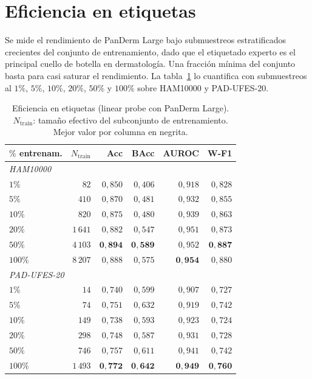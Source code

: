 \section{Eficiencia en etiquetas}
\label{sec:label-eff-results}

Se mide el rendimiento de PanDerm Large bajo submuestreos
estratificados crecientes del conjunto de entrenamiento, dado que el
etiquetado experto es el principal cuello de botella en dermatología.
Una fracción mínima del conjunto basta para casi saturar el
rendimiento. La tabla~\ref{tab:label-eff} lo cuantifica con
submuestreos al $1\%$,
$5\%$, $10\%$, $20\%$, $50\%$ y $100\%$ sobre HAM10000 y
PAD-UFES-20.

\begin{table}[htbp]
\centering
\footnotesize
\setlength{\tabcolsep}{4pt}
\renewcommand{\arraystretch}{0.95}
\caption{Eficiencia en etiquetas (linear probe con PanDerm Large).
$N_{\mathrm{train}}$: tamaño efectivo del subconjunto de
entrenamiento. Mejor valor por columna en negrita.}
\label{tab:label-eff}
\begin{tabular}{lrrrrr}
\hline
$\%$ entrenam.  & $N_{\mathrm{train}}$ & Acc           & BAcc          & AUROC         & W-F1 \\
\hline
\multicolumn{6}{l}{\textit{HAM10000}} \\
$1\%$           & $82$                 & $0{,}850$     & $0{,}406$     & $0{,}918$     & $0{,}828$ \\
$5\%$           & $410$                & $0{,}870$     & $0{,}481$     & $0{,}932$     & $0{,}855$ \\
$10\%$          & $820$                & $0{,}875$     & $0{,}480$     & $0{,}939$     & $0{,}863$ \\
$20\%$          & $1\,641$             & $0{,}882$     & $0{,}547$     & $0{,}951$     & $0{,}873$ \\
$50\%$          & $4\,103$             & $\mathbf{0{,}894}$ & $\mathbf{0{,}589}$ & $0{,}952$ & $\mathbf{0{,}887}$ \\
$100\%$         & $8\,207$             & $0{,}888$     & $0{,}575$     & $\mathbf{0{,}954}$ & $0{,}880$ \\
\hline
\multicolumn{6}{l}{\textit{PAD-UFES-20}} \\
$1\%$           & $14$                 & $0{,}740$     & $0{,}599$     & $0{,}907$     & $0{,}727$ \\
$5\%$           & $74$                 & $0{,}751$     & $0{,}632$     & $0{,}919$     & $0{,}742$ \\
$10\%$          & $149$                & $0{,}738$     & $0{,}593$     & $0{,}923$     & $0{,}724$ \\
$20\%$          & $298$                & $0{,}748$     & $0{,}587$     & $0{,}931$     & $0{,}728$ \\
$50\%$          & $746$                & $0{,}757$     & $0{,}611$     & $0{,}941$     & $0{,}742$ \\
$100\%$         & $1\,493$             & $\mathbf{0{,}772}$ & $\mathbf{0{,}642}$ & $\mathbf{0{,}949}$ & $\mathbf{0{,}760}$ \\
\hline
\end{tabular}
\end{table}

